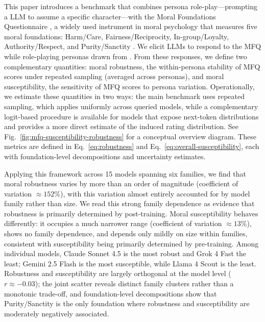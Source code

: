 \documentclass{article}
\begin{document}
This paper introduces a benchmark that combines persona role-play---prompting a LLM to assume a specific character---with the Moral Foundations Questionnaire \citep{moralfoundations2017questionnaires}, a widely used instrument in moral psychology that measures five moral foundations: Harm/Care, Fairness/Reciprocity, In-group/Loyalty, Authority/Respect, and Purity/Sanctity \citep{graham2009liberals,haidt2007when,moralfoundations2017questionnaires}. We elicit LLMs to respond to the MFQ while role-playing personas drawn from \citet{ge2025scalingsyntheticdatacreation}. From these responses, we define two complementary quantities: moral robustness, the within-persona stability of MFQ scores under repeated sampling (averaged across personas), and moral susceptibility, the sensitivity of MFQ scores to persona variation. Operationally, we estimate these quantities in two ways: the main benchmark uses repeated sampling, which applies uniformly across queried models, while a complementary logit-based procedure is available for models that expose next-token distributions and provides a more direct estimate of the induced rating distribution. See Fig.~\ref{fig:mfq-susceptibility-robustness} for a conceptual overview diagram. These metrics are defined in Eq.~\eqref{eq:robustness} and Eq.~\eqref{eq:overall-susceptibility}, each with foundation-level decompositions and uncertainty estimates. 


  

Applying this framework across 15 models spanning six families, we find that moral robustness varies by more than an order of magnitude (coefficient of variation $\approx 152\%$), with this variation almost entirely accounted for by model family rather than size. We read this strong family dependence as evidence that robustness is primarily determined by post-training. Moral susceptibility behaves differently: it occupies a much narrower range (coefficient of variation $\approx 13\%$), shows no family dependence, and depends only mildly on size within families, consistent with susceptibility being primarily determined by pre-training. Among individual models, Claude Sonnet 4.5 is the most robust and Grok 4 Fast the least; Gemini 2.5 Flash is the most susceptible, while Llama 4 Scout is the least. Robustness and susceptibility are largely orthogonal at the model level (\(r \approx -0.03\)); the joint scatter reveals distinct family clusters rather than a monotonic trade-off, and foundation-level decompositions show that Purity/Sanctity is the only foundation where robustness and susceptibility are moderately negatively associated.
\end{document}
